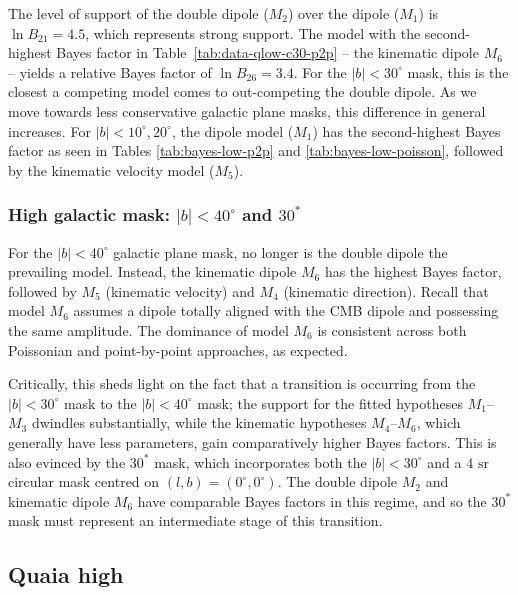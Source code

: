 \documentclass[fleqn,usenatbib]{mnras}
\begin{document}
        The level of support of the double dipole ($M_2$) over the dipole ($M_1$) is $\ln B_{21} = 4.5$, which represents strong support.
        The model with the second-highest Bayes factor in Table~\ref{tab:data-qlow-c30-p2p} -- the kinematic dipole $M_6$ -- yields a relative Bayes factor of $\ln B_{26} = 3.4$.
        For the $|b| < 30^\circ$ mask, this is the closest a competing model comes to out-competing the double dipole.
        As we move towards less conservative galactic plane masks, this difference in general increases.
        For $|b| < 10^\circ, 20^\circ$, the dipole model ($M_1$) has the second-highest Bayes factor as seen in Tables \ref{tab:bayes-low-p2p} and \ref{tab:bayes-low-poisson}, followed by the kinematic velocity model ($M_5$).
    
    \subsubsection{High galactic mask: $|b| < 40^\circ$ and $30^*$}
        \label{subs:high-gal-masks-low}
        For the $|b| < 40^\circ$ galactic plane mask, no longer is the double dipole the prevailing model.
        Instead, the kinematic dipole $M_6$ has the highest Bayes factor, followed by $M_5$ (kinematic velocity) and $M_4$ (kinematic direction).
        Recall that model $M_6$ assumes a dipole totally aligned with the CMB dipole and possessing the same amplitude.
        The dominance of model $M_6$ is consistent across both Poissonian and point-by-point approaches, as expected.
        
        Critically, this sheds light on the fact that a transition is occurring from the $|b| < 30^\circ$ mask to the $|b| < 40^\circ$ mask; the support for the fitted hypotheses $M_1$--$M_3$ dwindles substantially, while the kinematic hypotheses $M_4$--$M_6$, which generally have less parameters, gain comparatively higher Bayes factors.
        This is also evinced by the $30^*$ mask, which incorporates both the $|b| < 30^\circ$ and a $4 \text{ sr}$ circular mask centred on $(l,b) = (0^\circ, 0^\circ)$.
        The double dipole $M_2$ and kinematic dipole $M_6$ have comparable Bayes factors in this regime, and so the $30^*$ mask must represent an intermediate stage of this transition.
    
    \subsection{Quaia high}
        
\end{document}

